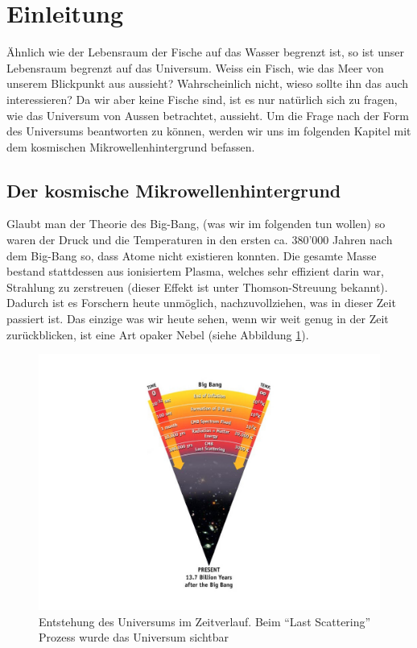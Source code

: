 \section{Einleitung}
Ähnlich wie der Lebensraum der Fische auf das Wasser begrenzt ist, so ist unser 
Lebensraum begrenzt auf das Universum.
Weiss ein Fisch, wie das Meer von unserem Blickpunkt aus aussieht?
Wahrscheinlich nicht, wieso sollte ihn das auch interessieren?
Da wir aber keine Fische sind, ist es nur natürlich sich zu fragen, wie das 
Universum von Aussen betrachtet, aussieht.
Um die Frage nach der Form des Universums beantworten zu können, werden wir uns 
im folgenden Kapitel mit dem kosmischen Mikrowellenhintergrund befassen.

\subsection{Der kosmische Mikrowellenhintergrund}
Glaubt man der Theorie des Big-Bang, (was wir im folgenden tun wollen) so waren 
der Druck und die Temperaturen in den ersten ca. 380'000 Jahren nach dem 
Big-Bang so, dass Atome nicht existieren konnten.
Die gesamte Masse bestand stattdessen aus ionisiertem Plasma, welches sehr 
effizient darin war, Strahlung zu zerstreuen (dieser Effekt ist unter 
Thomson-Streuung bekannt).
Dadurch ist es Forschern heute unmöglich, nachzuvollziehen, was in dieser Zeit 
passiert ist.
Das einzige was wir heute sehen, wenn wir weit genug in der Zeit zurückblicken,
ist eine Art opaker Nebel (siehe Abbildung \ref{fig:radiation_scattering}).
\begin{figure}
	\centering
	\includegraphics[width=\linewidth]{cmb/images/radiation_scattering.jpg}
	\caption{Entstehung des Universums im Zeitverlauf. Beim ``Last Scattering'' 
	Prozess wurde das Universum sichtbar}
	\label{fig:radiation_scattering}
\end{figure}

